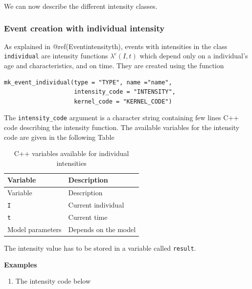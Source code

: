 We can now describe the different intensity classes.

\hypertarget{event-creation-with-individual-intensity}{%
\subsubsection{Event creation with individual intensity}\label{event-creation-with-individual-intensity}}

As explained in @ref(Eventintensityth), events with intensities in the class \texttt{individual} are intensity functions \(\lambda^e(I,t)\) which depend only on a individual's age and characteristics, and on time.
They are created using the function

\begin{verbatim}
mk_event_individual(type = "TYPE", name ="name",
                    intensity_code = "INTENSITY",
                    kernel_code = "KERNEL_CODE")
\end{verbatim}

The \texttt{intensity\_code} argument is a character string containing few lines C++ code describing the intensity function. The available variables for the intensity code are given in the following Table

\begin{longtable}[]{@{}ll@{}}
\caption{C++ variables available for individual intensities}\tabularnewline
\toprule
Variable & Description\tabularnewline
\midrule
\endfirsthead
\toprule
Variable & Description\tabularnewline
\midrule
\endhead
\texttt{I} & Current individual\tabularnewline
\texttt{t} & Current time\tabularnewline
Model parameters & Depends on the model\tabularnewline
\bottomrule
\end{longtable}

The intensity value has to be stored in a variable called \texttt{result}.

\textbf{Examples}

\begin{enumerate}
\def\labelenumi{\arabic{enumi}.}
\tightlist
\item
  The intensity code below
\end{enumerate}

\begin{Shaded}
\begin{Highlighting}[]
\end{Highlighting}
\end{Shaded}

